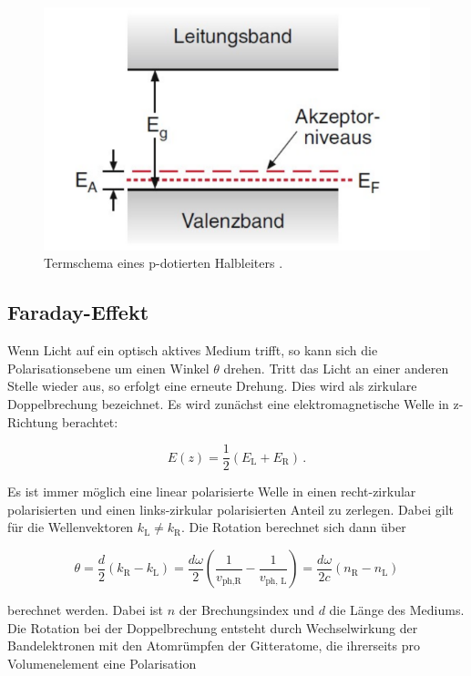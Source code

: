 \begin{figure}
    \centering
    \includegraphics[scale=0.3]{content/pdot.png}
    \caption{Termschema eines p-dotierten Halbleiters \cite{Dem}.}
    \label{fig:pdot}
\end{figure}

\subsection{Faraday-Effekt}

Wenn Licht auf ein optisch aktives Medium trifft, so kann sich die Polarisationsebene um einen Winkel $\theta$ drehen. Tritt das Licht an einer 
anderen Stelle wieder aus, so erfolgt eine erneute Drehung. Dies wird als zirkulare Doppelbrechung bezeichnet. Es wird zunächst eine 
elektromagnetische Welle in z-Richtung berachtet: 

\begin{equation*}
    E\left(z\right) = \frac{1}{2}\left(E_\text{L}+E_\text{R}\right)\,.
\end{equation*}

Es ist immer möglich eine linear polarisierte Welle in einen recht-zirkular polarisierten und einen links-zirkular polarisierten Anteil zu 
zerlegen. Dabei gilt für die Wellenvektoren $k_\text{L} \neq k_\text{R}$. Die Rotation berechnet sich dann über 

\begin{equation*}
    \theta = \frac{d}{2}\left(k_\text{R}-k_\text{L}\right) = \frac{d\omega}{2}\left(\frac{1}{v_\text{ph,R}}-\frac{1}{v_\text{ph, L}}\right) = \frac{d\omega}{2c}\left(n_\text{R}-n_\text{L}\right)
\end{equation*}

berechnet werden. Dabei ist $n$ der Brechungsindex und $d$ die Länge des Mediums. Die Rotation bei der Doppelbrechung entsteht 
durch Wechselwirkung der Bandelektronen mit den Atomrümpfen der Gitteratome, die ihrerseits pro Volumenelement eine Polarisation 

